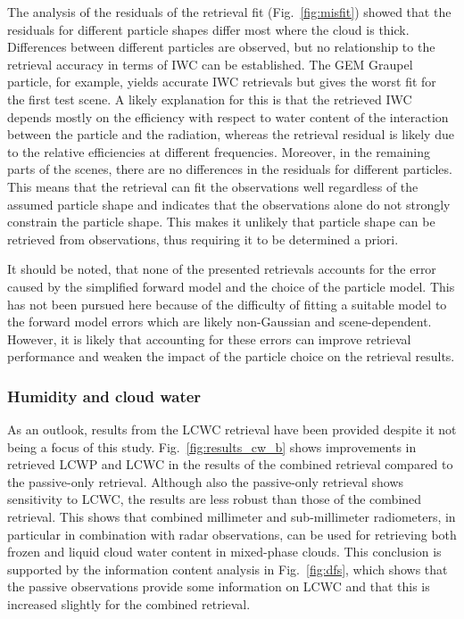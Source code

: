 \documentclass[journal abbreviation, manuscript]{copernicus}
\begin{document}
The analysis of the residuals of the retrieval fit (Fig.~\ref{fig:misfit})
showed that the residuals for different particle shapes differ most where the
cloud is thick. Differences between different particles are observed, but no
relationship to the retrieval accuracy in terms of IWC can be established. The
GEM Graupel particle, for example, yields accurate IWC retrievals but gives the
worst fit for the first test scene. A likely explanation for this is that the
retrieved IWC depends mostly on the efficiency with respect to water content of
the interaction between the particle and the radiation, whereas the retrieval
residual is likely due to the relative efficiencies at different frequencies.
Moreover, in the remaining parts of the scenes, there are no differences in the
residuals for different particles. This means that the retrieval can fit the
observations well regardless of the assumed particle shape and indicates that
the observations alone do not strongly constrain the particle shape. This 
makes it unlikely that particle shape can be retrieved from observations,
thus requiring it to be determined a priori.

It should be noted, that none of the presented retrievals accounts for the error
caused by the simplified forward model and the choice of the particle model.
This has not been pursued here because of the difficulty of fitting a suitable
model to the forward model errors which are likely non-Gaussian and
scene-dependent. However, it is likely that accounting for these errors can
improve retrieval performance and weaken the impact of the particle choice on
the retrieval results.

\subsubsection{Humidity and cloud water}

As an outlook, results from the LCWC retrieval have been provided despite it not
being a focus of this study. Fig.~\ref{fig:results_cw_b} shows improvements in
retrieved LCWP and LCWC in the results of the combined retrieval compared to the
passive-only retrieval. Although also the passive-only retrieval shows
sensitivity to LCWC, the results are less robust than those of the combined
retrieval. This shows that combined millimeter and sub-millimeter radiometers,
in particular in combination with radar observations, can be used for retrieving
both frozen and liquid cloud water content in mixed-phase clouds. This
conclusion is supported by the information content analysis in
Fig.~\ref{fig:dfs}, which shows that the passive observations provide some
information on LCWC and that this is increased slightly for the combined retrieval.
\end{document}
